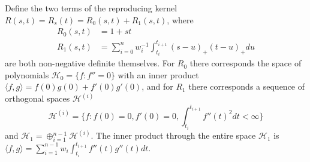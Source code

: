 Define the two terms of the reproducing kernel $R(s,t)=R_s(t)=R_0(s,t)+R_1(s,t)$, where
\begin{align}
R_0(s,t)&=1+st \\
R_1(s,t)&=\sum_{i=0}^{n}w_i^{-1}\int_{t_i}^{t_{i+1}}(s-u)_+(t-u)_+du
\end{align}
are both non-negative definite themselves. For $R_0$ there corresponds the space of polynomials $\mathcal{H}_0=\lbrace f:f''=0\rbrace$ with an inner product $\langle f,g\rangle = f(0)g(0)+f'(0)g'(0)$, and for $R_1$ there corresponds a sequence of orthogonal spaces $\mathcal{H}^{(i)}$
\begin{equation*}
\mathcal{H}^{(i)} = \lbrace f:f(0)=0,f'(0)=0,\int_{t_i}^{t_{i+1}}f''(t)^2dt<\infty \rbrace 
\end{equation*}
and $\mathcal{H}_1=\oplus _{i=1}^{n-1}\mathcal{H}^{(i)}$. The inner product through the entire space $\mathcal{H}_1$ is $\langle f,g \rangle = \sum_{i=1}^{n-1}w_i\int_{t_i}^{t_{i+1}}f''(t)g''(t)dt$. 


